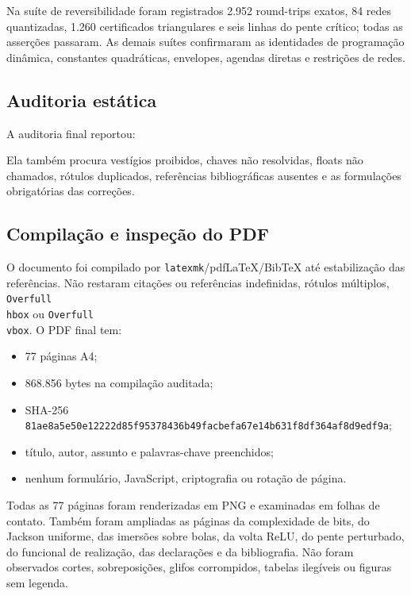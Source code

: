 \documentclass[11pt,a4paper]{article}
\begin{document}
Na suíte de reversibilidade foram registrados 2.952 round-trips exatos, 84 redes
quantizadas, 1.260 certificados triangulares e seis linhas do pente crítico; todas as
asserções passaram. As demais suítes confirmaram as identidades de programação dinâmica,
constantes quadráticas, envelopes, agendas diretas e restrições de redes.

\subsection{Auditoria estática}

A auditoria final reportou:
\begin{center}
\end{center}

Ela também procura vestígios proibidos, chaves não resolvidas, floats não chamados,
rótulos duplicados, referências bibliográficas ausentes e as formulações obrigatórias
das correções.

\subsection{Compilação e inspeção do PDF}

O documento foi compilado por \texttt{latexmk}/pdfLaTeX/BibTeX até estabilização das
referências. Não restaram citações ou referências indefinidas, rótulos múltiplos,
\texttt{Overfull \\hbox} ou \texttt{Overfull \\vbox}. O PDF final tem:
\begin{itemize}
  \item 77 páginas A4;
  \item 868.856 bytes na compilação auditada;
  \item SHA-256
  \nolinkurl{81ae8a5e50e12222d85f95378436b49facbefa67e14b631f8df364af8d9edf9a};
  \item título, autor, assunto e palavras-chave preenchidos;
  \item nenhum formulário, JavaScript, criptografia ou rotação de página.
\end{itemize}

Todas as 77 páginas foram renderizadas em PNG e examinadas em folhas de contato. Também
foram ampliadas as páginas da complexidade de bits, do Jackson uniforme, das imersões
sobre bolas, da volta ReLU, do pente perturbado, do funcional de realização, das
declarações e da bibliografia. Não foram observados cortes, sobreposições, glifos
corrompidos, tabelas ilegíveis ou figuras sem legenda.
\end{document}
